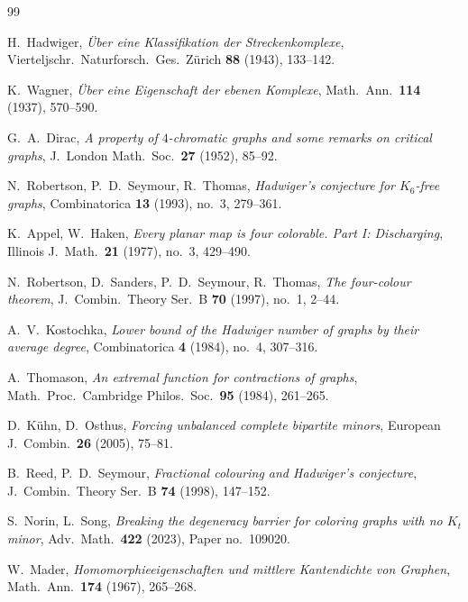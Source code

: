 \documentclass[12pt,a4paper]{amsart}
\theoremstyle{definition}
\theoremstyle{remark}
\begin{document}
\begin{thebibliography}{99}

H.~Hadwiger,
\textit{Über eine Klassifikation der Streckenkomplexe},
Vierteljschr.\ Naturforsch.\ Ges.\ Zürich \textbf{88} (1943), 133--142.

K.~Wagner,
\textit{Über eine Eigenschaft der ebenen Komplexe},
Math.\ Ann.\ \textbf{114} (1937), 570--590.

G.~A.\ Dirac,
\textit{A property of $4$-chromatic graphs and some remarks on critical graphs},
J.\ London Math.\ Soc.\ \textbf{27} (1952), 85--92.

N.~Robertson, P.~D.\ Seymour, R.~Thomas,
\textit{Hadwiger's conjecture for $K_6$-free graphs},
Combinatorica \textbf{13} (1993), no.\ 3, 279--361.

K.~Appel, W.~Haken,
\textit{Every planar map is four colorable. Part I: Discharging},
Illinois J.\ Math.\ \textbf{21} (1977), no.\ 3, 429--490.

N.~Robertson, D.~Sanders, P.~D.\ Seymour, R.~Thomas,
\textit{The four-colour theorem},
J.\ Combin.\ Theory Ser.\ B \textbf{70} (1997), no.\ 1, 2--44.

A.~V.\ Kostochka,
\textit{Lower bound of the Hadwiger number of graphs by their average degree},
Combinatorica \textbf{4} (1984), no.\ 4, 307--316.

A.~Thomason,
\textit{An extremal function for contractions of graphs},
Math.\ Proc.\ Cambridge Philos.\ Soc.\ \textbf{95} (1984), 261--265.

D.~Kühn, D.~Osthus,
\textit{Forcing unbalanced complete bipartite minors},
European J.\ Combin.\ \textbf{26} (2005), 75--81.

B.~Reed, P.~D.\ Seymour,
\textit{Fractional colouring and Hadwiger's conjecture},
J.\ Combin.\ Theory Ser.\ B \textbf{74} (1998), 147--152.

S.~Norin, L.~Song,
\textit{Breaking the degeneracy barrier for coloring graphs with no $K_t$ minor},
Adv.\ Math.\ \textbf{422} (2023), Paper no.\ 109020.

W.~Mader,
\textit{Homomorphieeigenschaften und mittlere Kantendichte von Graphen},
Math.\ Ann.\ \textbf{174} (1967), 265--268.

\end{thebibliography}
\end{document}
